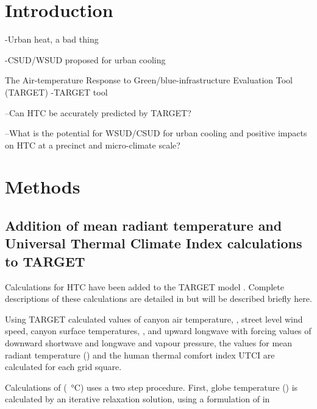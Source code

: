 \documentclass[final,3p,times,authoryear]{elsarticle}
\begin{document}
\section{Introduction}\label{sec:introduction}

-Urban heat, a bad thing

-CSUD/WSUD proposed for urban cooling

The Air-temperature Response to Green/blue-infrastructure Evaluation Tool (TARGET)
-TARGET tool \citep{Broadbent2018}

--Can HTC be accurately predicted by TARGET?

--What is the potential for WSUD/CSUD for urban cooling and positive impacts on HTC at a precinct and micro-climate scale?




\section{Methods}\label{sec:Methods}



\subsection{Addition of mean radiant temperature and Universal Thermal Climate Index calculations to TARGET}\label{sec:tmrtutci}

Calculations for HTC have been added to the TARGET model \citep{Broadbent2018}. Complete descriptions of these calculations are detailed in \cite{Nice2018} but will be described briefly here.

Using TARGET calculated values of canyon air temperature, , street level wind speed, canyon surface temperatures, , and upward longwave with forcing values of downward shortwave and longwave and vapour pressure, the values for mean radiant temperature () and the human thermal comfort index UTCI are calculated for each grid square.

Calculations of  (\SI{}{\degreeCelsius}) uses a two step procedure. First, globe temperature () is calculated by an iterative relaxation solution, using a formulation of \cite{Liljegren2008} in  
\end{document}
